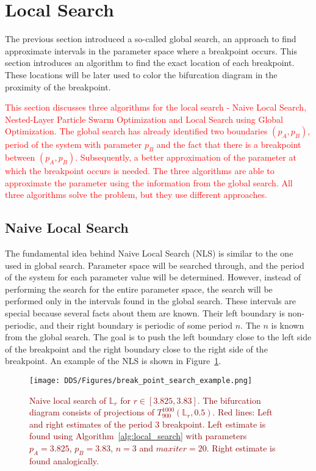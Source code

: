 \section{Local Search}
The previous section introduced a so-called global search, an approach to find approximate intervals in the parameter space where a breakpoint occurs.
This section introduces an algorithm to find the exact location of each breakpoint.
These locations will be later used to color the bifurcation diagram in the proximity of the breakpoint.
\par
\textcolor{red}{
This section discusses three algorithms for the local search - Naive Local Search, Nested-Layer Particle Swarm Optimization and Local Search using Global Optimization.
The global search has already identified two boundaries $(p_A, p_B)$, period of the system with parameter $p_B$ and the fact that there is a breakpoint between $(p_A, p_B)$.
Subsequently, a better approximation of the parameter at which the breakpoint occurs is needed.
The three algorithms are able to approximate the parameter using the information from the global search.
All three algorithms solve the problem, but they use different approaches.
}

\subsection{Naive Local Search}
The fundamental idea behind Naive Local Search (NLS) is similar to the one used in global search.
Parameter space will be searched through, and the period of the system for each parameter value will be determined.
However, instead of performing the search for the entire parameter space, the search will be performed only in the intervals found in the global search.
These intervals are special because several facts about them are known.
Their left boundary is non-periodic, and their right boundary is periodic of some period $n$.
The $n$ is known from the global search.
The goal is to push the left boundary close to the left side of the breakpoint and the right boundary close to the right side of the breakpoint.
An example of the NLS is shown in Figure~\ref{fig:break_point_search_example}.

\begin{figure}[!h]
    \centering
    \texttt{[image: DDS/Figures/break\_point\_search\_example.png]}
    \caption{
        \textcolor{darkred}{
        Naive local search of $\mathbb{L}_{r}$ for $r \in [ 3.825, 3.83 ]$.
        The bifurcation diagram consists of projections of $T_{900}^{1000}(\mathbb{L}_{r}, 0.5)$.
        Red lines: Left and right estimates of the period $3$ breakpoint.
        Left estimate is found using Algorithm~\ref{alg:local_search} with parameters $p_A = 3.825$, $p_B = 3.83$, $n = 3$ and $maxiter = 20$.
        Right estimate is found analogically.
        }
    }
    \label{fig:break_point_search_example}
\end{figure}



